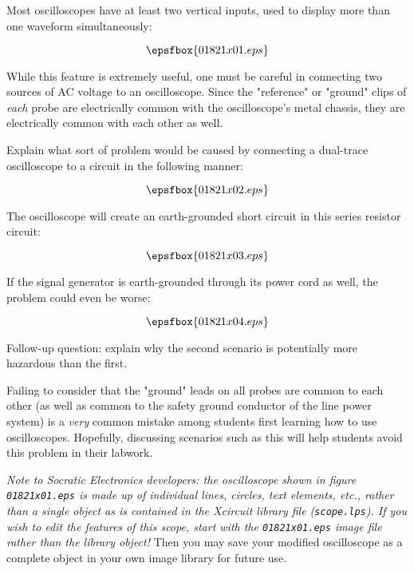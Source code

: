 

Most oscilloscopes have at least two vertical inputs, used to display more than one waveform simultaneously:

$$\epsfbox{01821x01.eps}$$

While this feature is extremely useful, one must be careful in connecting two sources of AC voltage to an oscilloscope.  Since the "reference" or "ground" clips of {\it each} probe are electrically common with the oscilloscope's metal chassis, they are electrically common with each other as well.

Explain what sort of problem would be caused by connecting a dual-trace oscilloscope to a circuit in the following manner:

$$\epsfbox{01821x02.eps}$$







The oscilloscope will create an earth-grounded short circuit in this series resistor circuit:

$$\epsfbox{01821x03.eps}$$

If the signal generator is earth-grounded through its power cord as well, the problem could even be worse:

$$\epsfbox{01821x04.eps}$$

\vskip 10pt

Follow-up question: explain why the second scenario is potentially more hazardous than the first.







Failing to consider that the "ground" leads on all probes are common to each other (as well as common to the safety ground conductor of the line power system) is a {\it very} common mistake among students first learning how to use oscilloscopes.  Hopefully, discussing scenarios such as this will help students avoid this problem in their labwork.

\vskip 10pt

{\it Note to Socratic Electronics developers: the oscilloscope shown in figure {\tt 01821x01.eps} is made up of individual lines, circles, text elements, etc., rather than a single object as is contained in the Xcircuit library file ({\tt scope.lps}).  If you wish to edit the features of this scope, start with the {\tt 01821x01.eps} image file rather than the library object!}  Then you may save your modified oscilloscope as a complete object in your own image library for future use.




